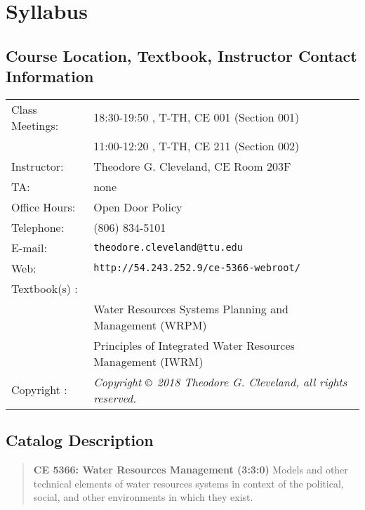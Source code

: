 \documentclass[12pt]{article}
\begin{document}
\section*{Syllabus}

\subsection*{{Course Location, Textbook, Instructor Contact Information}}
\begin{tabular}{p{1.5in}p{5.0in}}
Class Meetings:  &    18:30-19:50 , T-TH, CE 001 (Section 001) \\
~ &    11:00-12:20 , T-TH, CE 211 (Section 002) \\
Instructor: & Theodore G. Cleveland, CE Room 203F \\
TA: & none \\
Office Hours: & Open Door Policy \\
Telephone: & (806) 834-5101 \\
E-mail: & \texttt{theodore.cleveland@ttu.edu}\\
Web: & \texttt{http://54.243.252.9/ce-5366-webroot/} \\
Textbook(s) : &  ~ \\ 
~ & Water Resources Systems Planning and Management (WRPM) \citep{UNESCO2005}\\
~ & Principles of Integrated Water Resources Management (IWRM) \citep{UNESCO-IHE2014}\\
Copyright : & \textsl{Copyright $\copyright$ 2018 Theodore G. Cleveland, all rights reserved.} \\
\end{tabular}
\subsection*{{Catalog Description}}
\begin{quote} \textbf{CE 5366: Water Resources Management (3:3:0)} 
Models and other technical elements of water resources systems in context of the political, social, and other environments in which they exist.
\end{quote}
\end{document}
